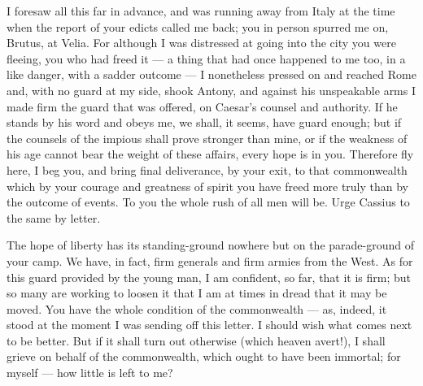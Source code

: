  I foresaw all this far in advance, and was running away from Italy at the time when the report of your edicts called me back; you in person spurred me on, Brutus, at Velia. For although I was distressed at going into the city you were fleeing, you who had freed it --- a thing that had once happened to me too, in a like danger, with a sadder outcome --- I nonetheless pressed on and reached Rome and, with no guard at my side, shook Antony, and against his unspeakable arms I made firm the guard that was offered, on Caesar's counsel and authority. If he stands by his word and obeys me, we shall, it seems, have guard enough; but if the counsels of the impious shall prove stronger than mine, or if the weakness of his age cannot bear the weight of these affairs, every hope is in you. Therefore fly here, I beg you, and bring final deliverance, by your exit, to that commonwealth which by your courage and greatness of spirit you have freed more truly than by the outcome of events. To you the whole rush of all men will be. Urge Cassius to the same by letter.

 The hope of liberty has its standing-ground nowhere but on the parade-ground of your camp. We have, in fact, firm generals and firm armies from the West. As for this guard provided by the young man, I am confident, so far, that it is firm; but so many are working to loosen it that I am at times in dread that it may be moved. You have the whole condition of the commonwealth --- as, indeed, it stood at the moment I was sending off this letter. I should wish what comes next to be better. But if it shall turn out otherwise (which heaven avert!), I shall grieve on behalf of the commonwealth, which ought to have been immortal; for myself --- how little is left to me?
